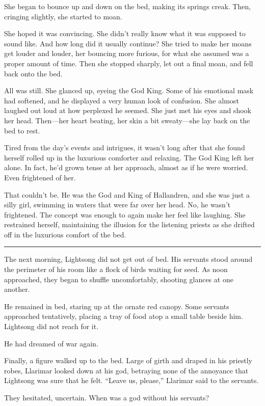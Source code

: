 She began to bounce up and down on the bed, making its springs creak. Then, cringing slightly, she started to moan.

She hoped it was convincing. She didn’t really know what it was supposed to sound like. And how long did it usually continue? She tried to make her moans get louder and louder, her bouncing more furious, for what she assumed was a proper amount of time. Then she stopped sharply, let out a final moan, and fell back onto the bed.

All was still. She glanced up, eyeing the God King. Some of his emotional mask had softened, and he displayed a very human look of confusion. She almost laughed out loud at how perplexed he seemed. She just met his eyes and shook her head. Then—her heart beating, her skin a bit sweaty—she lay back on the bed to rest.

Tired from the day’s events and intrigues, it wasn’t long after that she found herself rolled up in the luxurious comforter and relaxing. The God King left her alone. In fact, he’d grown tense at her approach, almost as if he were worried. Even frightened of her.

That couldn’t be. He was the God and King of Hallandren, and she was just a silly girl, swimming in waters that were far over her head. No, he wasn’t frightened. The concept was enough to again make her feel like laughing. She restrained herself, maintaining the illusion for the listening priests as she drifted off in the luxurious comfort of the bed.

\bigskip \hrule \bigskip

The next morning, Lightsong did not get out of bed. His servants stood around the perimeter of his room like a flock of birds waiting for seed. As noon approached, they began to shuffle uncomfortably, shooting glances at one another.

He remained in bed, staring up at the ornate red canopy. Some servants approached tentatively, placing a tray of food atop a small table beside him. Lightsong did not reach for it.

He had dreamed of war again.

Finally, a figure walked up to the bed. Large of girth and draped in his priestly robes, Llarimar looked down at his god, betraying none of the annoyance that Lightsong was sure that he felt. “Leave us, please,” Llarimar said to the servants.

They hesitated, uncertain. When was a god without his servants?

